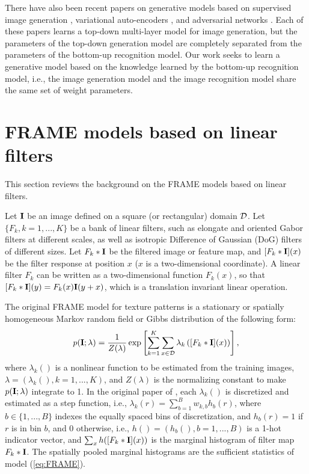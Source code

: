 \documentclass[letterpaper]{article}
\def\I{{\bf I}}
\begin{document}
There have also been recent papers on generative models based on supervised image generation \citep{Alexey2015}, variational auto-encoders \citep{Hinton95thewake-sleep, KingmaCoRR13, RezendeICML2014, MnihGregor2014, Kulkarni2015, KarolICML2015}, and adversarial networks \citep{Denton2015a}. Each of these papers  learns a top-down multi-layer model for image generation, but the parameters of the top-down generation model are completely separated from the parameters of the bottom-up recognition model.  Our work seeks to learn a generative model based on the knowledge learned by the bottom-up recognition model, i.e., the image generation model and the image recognition model share the same set of weight parameters. 



\section{FRAME models based on linear filters} 

This section reviews the background on the FRAME models based on linear filters. 

Let $\I$ be an image defined on a square (or rectangular) domain ${\cal D}$.   Let $\{F_k, k = 1, ..., K\}$ be a bank of linear filters, such as elongate and oriented Gabor filters at different scales, as well as isotropic Difference of Gaussian (DoG) filters of different sizes. Let $F_k *\I$ be the filtered image or feature map, and $[F_k*\I](x)$ be the filter response at position $x$ ($x$ is a two-dimensional coordinate). A linear filter $F_k$ can be written as a two-dimensional function $F_k( x)$, so that $[F_k *\I](y) = F_k( x) \I(y+x)$, which is a translation invariant linear operation. 

The original FRAME model \citep{zhu1997minimax}  for texture patterns is a stationary or spatially homogeneous Markov random field or Gibbs distribution of the following form: 
\begin{eqnarray}
   p(\I; \lambda) = \frac{1}{Z(\lambda)} \exp \left[\sum_{k=1}^{K} \sum_{x \in {\cal D}} \lambda_{k} \left([F_k*\I](x)\right)\right], 
   \label{eq:FRAME}
\end{eqnarray}
where $\lambda_k()$ is a nonlinear function to be estimated from the training images, $\lambda = (\lambda_k(), k = 1, ..., K)$, and $Z(\lambda)$ is the normalizing constant to make $p(\I; \lambda)$ integrate to 1. In the original paper of \cite{zhu1997minimax}, each $\lambda_k()$ is discretized and estimated as a step function, i.e., $\lambda_k(r) = \sum_{b=1}^{B} w_{k, b} h_b(r)$, where $b \in \{1, ..., B\}$ indexes the equally spaced bins of discretization, and $h_b(r) = 1$ if $r$ is in bin $b$, and 0 otherwise, i.e., $h() = (h_b(), b = 1, ..., B)$ is a 1-hot indicator vector, and $\sum_x h([F_k*\I](x))$ is the marginal histogram of filter map $F_k*\I$. The spatially pooled marginal histograms are the sufficient statistics of model (\ref{eq:FRAME}). 
\end{document}
